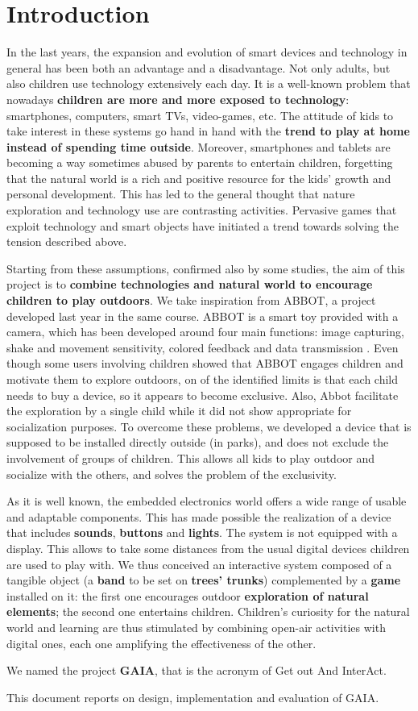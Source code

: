 \documentclass[a4paper,11pt]{report}
\begin{document}
\chapter{Introduction}
In the last years, the expansion and evolution of smart devices and technology in general has been both an advantage and a disadvantage.
Not only adults, but also children use technology extensively each day. It is a well-known problem that nowadays \textbf{children are more and more exposed to technology}: smartphones, computers, smart TVs, video-games, etc. The attitude of kids to take interest in these systems go hand in hand with the \textbf{trend to play at home instead of spending time outside}. Moreover, smartphones and tablets are becoming a way sometimes abused by parents to entertain children, forgetting that the natural world is a rich and positive resource for the kids' growth and personal development. This has led to the general thought that nature exploration and technology use are contrasting activities. Pervasive games that exploit technology and smart objects have initiated a trend towards solving the tension described above.\par
Starting from these assumptions, confirmed also by some studies, the aim of this project is to \textbf{combine technologies and natural world to encourage children to play outdoors}. We take inspiration from ABBOT, a project developed last year in the same course. ABBOT is a smart toy provided with a camera, which has been developed around four main functions: image capturing, shake and movement sensitivity, colored feedback and data transmission \cite{abbot}. Even though some users involving children showed that ABBOT engages children and motivate them to explore outdoors, on of the identified limits is that each child needs to buy a device, so it appears to become exclusive. Also, Abbot facilitate the exploration by a single child while it did not show appropriate for socialization purposes. To overcome these problems, we developed a device that is supposed to be installed directly outside (in parks), and does not exclude the involvement of groups of children. This allows all kids to play outdoor and socialize with the others, and solves the problem of the exclusivity.\par
As it is well known, the embedded electronics world offers a wide range of usable and adaptable components. This has made possible the realization of a device that includes \textbf{sounds}, \textbf{buttons} and \textbf{lights}. The system is not equipped with a display. This allows to take some distances from the usual digital devices children are used to play with. We thus conceived an interactive system composed of a tangible object (a \textbf{band} to be set on \textbf{trees' trunks}) complemented by a \textbf{game} installed on it: the first one encourages outdoor \textbf{exploration of natural elements}; the second one entertains children. Children's curiosity for the natural world and learning are thus stimulated by combining open-air activities with digital ones, each one amplifying the effectiveness of the other.\par
We named the project \textbf{GAIA}, that is the acronym of Get out And InterAct.\par
This document reports on design, implementation and evaluation of GAIA.
\end{document}
